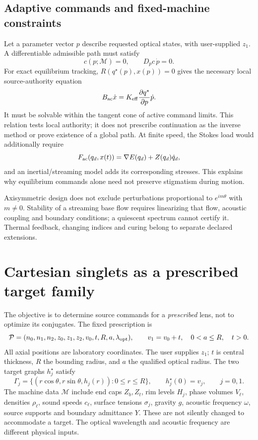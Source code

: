 \subsection{Adaptive commands and fixed-machine constraints}
Let a parameter vector $p$ describe requested optical states, with user-supplied
$z_1$. A differentiable admissible path must satisfy
\begin{equation}\label{eq:family-tangent}
 c(p;\mathcal M)=0,\qquad D_pc\,\dot p=0.
\end{equation}
For exact equilibrium tracking, $R(q^\star(p),x(p))=0$ gives the necessary
local source-authority equation
\begin{equation}\label{eq:tracking-authority}
 B_{\rm ac}\dot x=K_{\rm eff}\frac{\partial q^\star}{\partial p}\dot p.
\end{equation}
It must be solvable within the tangent cone of active command limits.
This relation tests local authority; it does not prescribe continuation as
the inverse method or prove existence of a global path. At finite speed,
the Stokes load would additionally require
\begin{equation}\label{eq:dynamic-load}
 F_{\rm ac}(q_d,x(t))=\nabla E(q_d)+Z(q_d)\dot q_d,
\end{equation}
and an inertial/streaming model adds its corresponding stresses. This explains
why equilibrium commands alone need not preserve stigmatism during motion.

Axisymmetric design does not exclude perturbations proportional to
$e^{im\theta}$ with $m\ne0$. Stability of a streaming base flow requires
linearizing that flow, acoustic coupling and boundary conditions; a quiescent
spectrum cannot certify it. Thermal feedback, changing indices and curing
belong to separate declared extensions.

\section{Cartesian singlets as a prescribed target family}
\label{sec:ssl-specialization}
The objective is to determine source commands for a \emph{prescribed} lens,
not to optimize its conjugates. The fixed prescription is
\begin{equation}\label{eq:ssl-data}
 \mathcal P=(n_0,n_1,n_2,z_0,z_1,z_2,v_0,t,R,a,\lambda_{\rm opt}),
 \qquad v_1=v_0+t,\quad 0<a\le R,\quad t>0.
\end{equation}
All axial positions are laboratory coordinates. The user supplies $z_1$;
$t$ is central thickness, $R$ the bounding radius, and $a$ the qualified
optical radius. The two target graphs $h_j^\star$ satisfy
\begin{equation}\label{eq:ssl-graphs}
 \Gamma_j=\{(r\cos\theta,r\sin\theta,h_j(r)):0\le r\le R\},
 \qquad h_j^\star(0)=v_j,\qquad j=0,1.
\end{equation}
The machine data $\mathcal M$ include end caps $Z_b,Z_t$, rim levels $H_j$,
phase volumes $V_\ell$, densities $\rho_\ell$, sound speeds $c_\ell$,
surface tensions $\sigma_j$, gravity $g$, acoustic frequency $\omega$,
source supports and boundary admittance $Y$. These are not silently changed
to accommodate a target. The optical wavelength and acoustic frequency are
different physical inputs.

